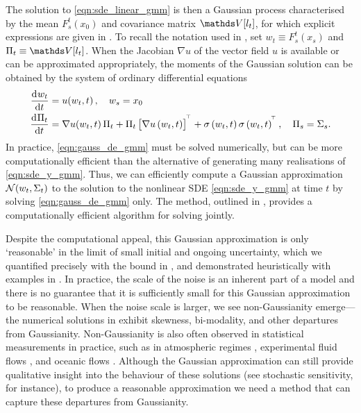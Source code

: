 The solution to \cref{eqn:sde_linear_gmm} is then a Gaussian process characterised by the mean \(F_s^t\!\left(x_0\right)\) and covariance matrix \(\var{l_t}\), for which explicit expressions are given in .
To recall the notation used in , set \(w_t \equiv F_s^t\!\left(x_s\right)\) and \(\Pi_t \equiv \var{l_t}\).
When the Jacobian \(\nabla u\) of the vector field \(u\) is available or can be approximated appropriately, the moments of the Gaussian solution can be obtained by the system of ordinary differential equations
\begin{subequations}\label{eqn:gauss_de_gmm}
	\begin{align}
		\dod{w_t}{t}   & = u\!\left(w_t, t\right), \quad w_s = x_0 \label{eqn:gauss_mean_de_gmm}                                                                                                       \\
		\dod{\Pi_t}{t} & = \begin{multlined}[t]
			                   \nabla u\!\left(w_t, t\right) \Pi_t + \Pi_t\left[\nabla u\left(w_t, t\right)\right]^{\T} + \sigma\left(w_t, t \right)\sigma\left(w_t, t\right)^{\T}, \quad \Pi_s = \Sigma_s.
		                   \end{multlined}
		\label{eqn:gauss_cov_de_gmm}
	\end{align}
\end{subequations}
In practice, \cref{eqn:gauss_de_gmm} must be solved numerically, but can be more computationally efficient than the alternative of generating many realisations of \cref{eqn:sde_y_gmm}.
Thus, we can efficiently compute a Gaussian approximation \(\mathcal{N}\!\left(w_t, \Sigma_t\right)\) to the solution to the nonlinear SDE \cref{eqn:sde_y_gmm} at time \(t\) by solving \cref{eqn:gauss_de_gmm} only.
The \citet{Mazzoni_2008_ComputationalAspectsContinuous} method, outlined in , provides a computationally efficient algorithm for solving  jointly.

Despite the computational appeal, this Gaussian approximation is only `reasonable' in the limit of small initial and ongoing uncertainty, which we quantified precisely with the bound in , and demonstrated heuristically with examples in .
In practice, the scale of the noise is an inherent part of a model and there is no guarantee that it is sufficiently small for this Gaussian approximation to be reasonable.
When the noise scale is larger, we see non-Gaussianity emerge---the numerical solutions in  exhibit skewness, bi-modality, and other departures from Gaussianity.
Non-Gaussianity is also often observed in statistical measurements in practice, such as in atmospheric regimes \citep{SuraEtAl_2005_MultiplicativeNoiseNonGaussianity}, experimental fluid flows \citep{del-Castillo-Negrete_1998_AsymmetricTransportNonGaussian}, and oceanic flows \citep{BraccoEtAl_2000_VelocityProbabilityDensity}.
Although the Gaussian approximation can still provide qualitative insight into the behaviour of these solutions (see stochastic sensitivity, for instance), to produce a reasonable approximation we need a method that can capture these departures from Gaussianity.

